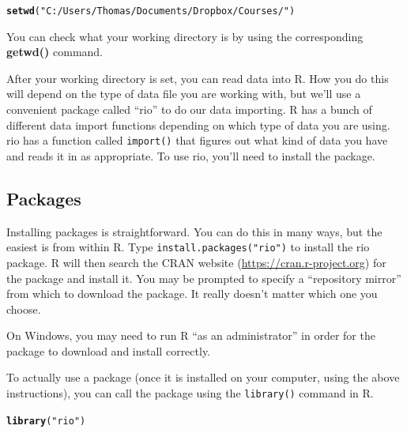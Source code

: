 \documentclass[12pt]{article}\usepackage[]{graphicx}\usepackage[]{color}
\makeatletter
\newcommand{\hlstr}[1]{\textcolor[rgb]{0.192,0.494,0.8}{#1}}%
\newcommand{\hlstd}[1]{\textcolor[rgb]{0.345,0.345,0.345}{#1}}%
\newcommand{\hlkwd}[1]{\textcolor[rgb]{0.737,0.353,0.396}{\textbf{#1}}}%
\newenvironment{kframe}{%
 \def\at@end@of@kframe{}%
 \ifinner\ifhmode%
  \def\at@end@of@kframe{\end{minipage}}%
  \begin{minipage}{\columnwidth}%
 \fi\fi%
 \def\FrameCommand##1{\hskip\@totalleftmargin \hskip-\fboxsep
 \colorbox{shadecolor}{##1}\hskip-\fboxsep
     \hskip-\linewidth \hskip-\@totalleftmargin \hskip\columnwidth}%
 \MakeFramed {\advance\hsize-\width
   \@totalleftmargin\z@ \linewidth\hsize
   \@setminipage}}%
 {\par\unskip\endMakeFramed%
 \at@end@of@kframe}
\newenvironment{knitrout}{}{} %
\makeatother
\begin{document}
\begin{knitrout}
\color{fgcolor}\begin{kframe}
\begin{alltt}
\hlkwd{setwd}\hlstd{(}\hlstr{"C:/Users/Thomas/Documents/Dropbox/Courses/"}\hlstd{)}
\end{alltt}
\end{kframe}
\end{knitrout}

You can check what your working directory is by using the corresponding \textbf{getwd()} command.

After your working directory is set, you can read data into R. How you do this will depend on the type of data file you are working with, but we'll use a convenient package called ``rio'' to do our data importing. R has a bunch of different data import functions depending on which type of data you are using. rio has a function called \texttt{import()} that figures out what kind of data you have and reads it in as appropriate. To use rio, you'll need to install the package.

\subsection{Packages}
Installing packages is straightforward. You can do this in many ways, but the easiest is from within R. Type \texttt{install.packages("rio")} to install the rio package. R will then search the CRAN website (\url{https://cran.r-project.org}) for the package and install it. You may be prompted to specify a ``repository mirror'' from which to download the package. It really doesn't matter which one you choose.

On Windows, you may need to run R ``as an administrator'' in order for the package to download and install correctly.

To actually use a package (once it is installed on your computer, using the above instructions), you can call the package using the \texttt{library()} command in R.

\begin{knitrout}
\color{fgcolor}\begin{kframe}
\begin{alltt}
\hlkwd{library}\hlstd{(}\hlstr{"rio"}\hlstd{)}
\end{alltt}
\end{kframe}
\end{knitrout}
\end{document}
